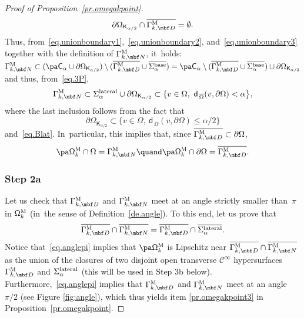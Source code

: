 \begin{proof}[Proof of Proposition~\ref{pr.omegakpoint}]
\begin{equation}
\partial \Omega_{\mathsf K_{\alpha/2}}\cap \overline{\Gamma_{k,\mbf D}^{\text{M}}}=\emptyset.
\end{equation}
Thus, from~\eqref{eq.unionboundary1},~\eqref{eq.unionboundary2}, and~\eqref{eq.unionboundary3} together with the definition of $\Gamma_{k,\mbf N}^{\text{M}}$, it~holds: $\Gamma_{k,\mbf N}^{\text{M}} \subset (\pa \mathsf C_\alpha \cup \partial \Omega_{\mathsf K_{\alpha/2}})\setminus (\overline{\Gamma_{k,\mbf D}^{\text{M}}}\cup \overline{ \Sigma_\alpha^{\textup{base}}}) = \pa \mathsf C_\alpha \setminus (\overline{\Gamma_{k,\mbf D}^{\text{M}}}\cup \overline{ \Sigma_\alpha^{\textup{base}}}) \cup \partial \Omega_{\mathsf K_{\alpha/2}}$ and thus, from~\eqref{eq.3P},
\begin{equation}\label{eq.GK2}
\Gamma_{k,\mbf N}^{\text{M}} \subset \Sigma_\alpha^{\textup{lateral}} \cup \partial \Omega_{\mathsf K_{\alpha/2}} \subset \{v\in \Omega, \ \mathsf d_{\, \overline \Omega}(v,\partial \Omega)< {\alpha} \big \},
\end{equation}
where the last inclusion follows from the fact that
\[
\partial \Omega_{\mathsf K_{\alpha/2}}\subset \{v\in \Omega, \ \mathsf d_{\, \overline \Omega}(v,\partial \Omega)\le \alpha / {2}\big \}
\]
and~\eqref{eq.Blat}. In~particular, this implies that, since $\overline{\Gamma_{k,\mbf D}^{\text{M}}}\subset \partial \Omega$,
\begin{equation}\label{eq.onm}
\pa \mathsf \Omega_k^{\textsc{M}} \cap \Omega =\Gamma_{k,\mbf N}^{\text{M}} \quand \pa \mathsf \Omega_k^{\textsc{M}} \cap \partial \Omega = \overline{\Gamma_{k,\mbf D}^{\text{M}}}.
\end{equation}


\subsubsection*{Step 2a} Let us check that $\Gamma_{k,\mbf
D}^{\textsc{M}} $ and $\Gamma_{k,\mbf N}^{\textsc{M}}$ meet
at an angle strictly smaller than~$\pi$ in $\mathsf
\Omega_k^{\textsc{M}}$ (in~the sense of Definition~\ref{de.angle}). To this end, let us prove that
\begin{equation}\label{eq.anglepi}
\overline{\Gamma_{k,\mbf D}^{\textsc{M}} }\cap \overline{\Gamma_{k,\mbf N}^{\textsc{M}}}=\overline{\Gamma_{k,\mbf D}^{\textsc{M}} }\cap \overline{\Sigma_\alpha^{\textup{lateral}}}.
\end{equation}
Notice that~\eqref{eq.anglepi} implies that $\pa \mathsf
\Omega_k^{\textsc{M}}$ is Lipschitz near
$\overline{\Gamma_{k,\mbf D}^{\textsc{M}} }\cap
\overline{\Gamma_{k,\mbf N}^{\textsc{M}}}$ as the union of
the closures of two disjoint open transverse $\mathcal
C^\infty$ hypersurfaces $\Gamma_{k,\mbf D}^{\textsc{M}}$ and
$\Sigma_\alpha^{\textup{lateral}}$ (this will be used in Step 3b below). Furthermore,~\eqref{eq.anglepi}
implies that $\Gamma_{k,\mbf D}^{\textsc{M}} $ and
$\Gamma_{k,\mbf N}^{\textsc{M}}$ meet at an angle $\pi/2$
(see Figure \ref{fig:angle}), which thus yields item \eqref{pr.omegakpoint3} in Proposition~\ref{pr.omegakpoint}.


\end{proof}
